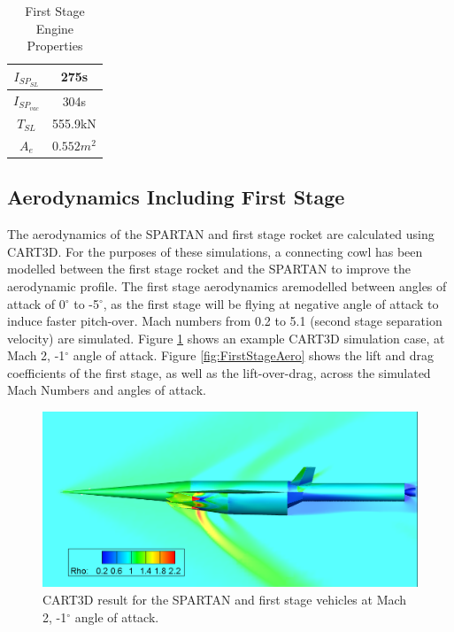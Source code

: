 \begin{table}[h]
	\centering
	\begin{tabular}{|c|c|}
		\hline  $I_{SP_{SL}}$ & 275s \\ 
		\hline  $I_{SP_{vac}}$ & 304s\\ 
		\hline  $T_{SL}$ & 555.9kN \\ 
		\hline  $A_{e}$ & $0.552m^2$ \\ 
		\hline 
	\end{tabular} 
	\caption{First Stage Engine Properties}
	\label{tab:1stStageEngine}
\end{table}


  \subsection{Aerodynamics Including First Stage}

  
  The aerodynamics of the SPARTAN and first stage rocket are calculated using CART3D. For the purposes of these simulations, a connecting cowl has been modelled between the first stage rocket and the SPARTAN to improve the aerodynamic profile. The first stage aerodynamics aremodelled between angles of attack of 0$^\circ$ to -5$^\circ$, as the first stage will be flying at negative angle of attack to induce faster pitch-over. Mach numbers from 0.2 to 5.1 (second stage separation velocity) are simulated. Figure \ref{fig:CARTcontour} shows an example CART3D simulation case, at Mach 2, -1$^\circ$ angle of attack. Figure \ref{fig:FirstStageAero} shows the lift and drag coefficients of the first stage, as well as the lift-over-drag, across the simulated Mach Numbers and angles of attack. 
  
  
  
  \begin{figure}
  	\centering
  	\includegraphics[width=0.7\linewidth]{figures/3_vehicle_design/CARTcontour}
  	\caption{CART3D result for the SPARTAN and first stage vehicles at Mach 2, -1$^\circ$ angle of attack.}
  	\label{fig:CARTcontour}
  \end{figure}

